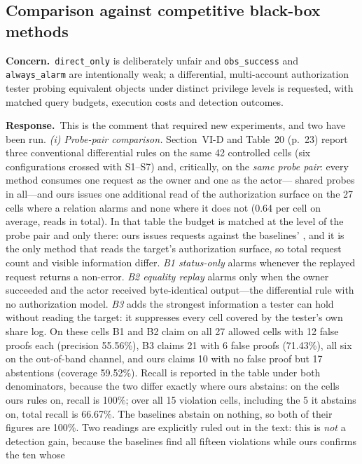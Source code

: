 \documentclass[10pt,letterpaper]{article}
\newcommand{\Concern}[1]{\par\smallskip\noindent\textbf{Concern.}\ #1\par}
\newcommand{\Response}[1]{\par\smallskip\noindent\textbf{Response.}\ #1\par}
\begin{document}
\subsection{Comparison against competitive black-box methods}
\Concern{\texttt{direct\_only} is deliberately unfair and \texttt{obs\_success} and
\texttt{always\_alarm} are intentionally weak; a differential, multi-account
authorization tester probing equivalent objects under distinct privilege levels
is requested, with matched query budgets, execution costs and detection
outcomes.}
\Response{This is the comment that required new experiments, and two have been
run. \emph{(i) Probe-pair comparison.} Section~VI-D and Table~20 (p.~23) report
three conventional differential
rules on the same 42 controlled cells (six configurations crossed with S1--S7)
and, critically, on the \emph{same probe pair}: every method consumes one request
as the owner and one as the actor---\BlSharedProbes{} shared probes in all---and
ours issues one additional read of the
authorization surface on the 27 cells where a relation alarms and none where it
does not (0.64 per cell on average, \BlOursExtraTotal{} reads in total). In that
table the budget is matched at the level of the probe pair and only there: ours
issues \BlOursRequestsTotal{} requests against the baselines' \BlSharedProbes{},
and it is the only method that reads the target's authorization surface, so
total request count and visible information differ.
\emph{B1 status-only} alarms whenever the
replayed request returns a non-error. \emph{B2 equality replay} alarms only when
the owner succeeded and the actor received byte-identical output---the
differential rule with no authorization model. \emph{B3} adds the strongest
information a tester can hold without reading the target: it suppresses every
cell covered by the tester's own share log. On these cells B1 and B2 claim on all
27 allowed cells with 12 false proofs each (precision 55.56\%), B3 claims 21 with
6 false proofs (71.43\%), all six on the out-of-band channel, and ours claims 10
with no false proof but 17 abstentions (coverage 59.52\%). Recall is reported in
the table under both denominators, because the two differ exactly where ours
abstains: on the cells ours rules on, recall is 100\%; over all 15 violation
cells, including the 5 it abstains on, total recall is 66.67\%. The baselines
abstain on nothing, so both of their figures are 100\%. Two readings are
explicitly ruled out in the text: this is \emph{not} a detection gain, because
the baselines find all fifteen violations while ours confirms the ten whose
}
\end{document}
